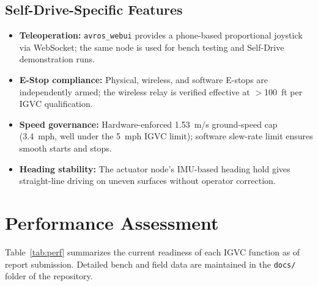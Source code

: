 \documentclass[11pt, letterpaper]{article}
\begin{document}
\subsection{Self-Drive-Specific Features}

\begin{itemize}
    \item \textbf{Teleoperation:} \texttt{avros\_webui} provides a phone-based proportional joystick via WebSocket; the same node is used for bench testing and Self-Drive demonstration runs.
    \item \textbf{E-Stop compliance:} Physical, wireless, and software E-stops are independently armed; the wireless relay is verified effective at $>$100~ft per IGVC qualification.
    \item \textbf{Speed governance:} Hardware-enforced 1.53~m/s ground-speed cap (3.4~mph, well under the 5~mph IGVC limit); software slew-rate limit ensures smooth starts and stops.
    \item \textbf{Heading stability:} The actuator node's IMU-based heading hold gives straight-line driving on uneven surfaces without operator correction.
\end{itemize}

\section{Performance Assessment}

Table~\ref{tab:perf} summarizes the current readiness of each IGVC function as of report
submission. Detailed bench and field data are maintained in the \texttt{docs/} folder of
the repository.
\end{document}
